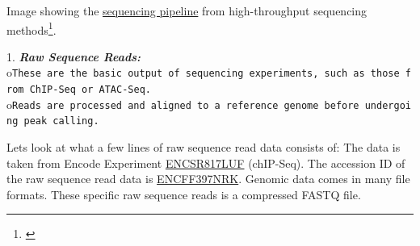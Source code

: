 \documentclass[
]{book}
\begin{document}
Image showing the \href{https://compgenomr.github.io/book/images/HTseq.png}{sequencing pipeline} from high-throughput sequencing methods\footnote{\citet{akalin2020}}.

1. \textbf{\emph{Raw Sequence Reads:}}
o\texttt{These\ are\ the\ basic\ output\ of\ sequencing\ experiments,\ such\ as\ those\ from\ ChIP-Seq\ or\ ATAC-Seq.}
o\texttt{Reads\ are\ processed\ and\ aligned\ to\ a\ reference\ genome\ before\ undergoing\ peak\ calling.}

Lets look at what a few lines of raw sequence read data consists of:
The data is taken from Encode Experiment \href{https://www.encodeproject.org/experiments/ENCSR817LUF/}{ENCSR817LUF} (chIP-Seq). The accession ID of the raw sequence read data is \href{https://www.encodeproject.org/files/ENCFF397NRK/}{ENCFF397NRK}. Genomic data comes in many file formats. These specific raw sequence reads is a compressed FASTQ file.
\end{document}
